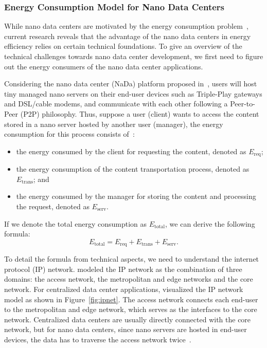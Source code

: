 \subsubsection{Energy Consumption Model for Nano Data Centers}

While nano data centers are motivated by the energy consumption problem~\cite{DBLP:conf/conext/ValanciusLMDR09},
current research reveals that the advantage of the nano data centers in energy efficiency relies on certain technical foundations.
To give an overview of the technical challenges towards nano data center development,
we first need to figure out the energy consumers of the nano data center applications.

Considering the nano data center (NaDa) platform proposed in~\cite{DBLP:conf/conext/ValanciusLMDR09},
users will host tiny managed nano servers on their end-user devices such as Triple-Play gateways and DSL/cable modems,
and communicate with each other following a Peer-to-Peer (P2P) philosophy.
Thus, suppose a user (client) wants to access the content stored in a nano server hosted by another user (manager),
the energy consumption for this process consists of~\cite{DBLP:journals/sigmetrics/JalaliAVHAT14}:
\begin{itemize}
\item the energy consumed by the client for requesting the content, denoted as $E_\text{req}$;
\item the energy consumption of the content transportation process, denoted as $E_\text{trans}$; and
\item the energy consumed by the manager for storing the content and processing the request, denoted as $E_\text{serv}$.
\end{itemize}
If we denote the total energy consumption as $E_\text{total}$, we can derive the following formula:
\begin{equation}
E_\text{total}=E_\text{req}+E_\text{trans}+E_\text{serv} \label{abstract_model}.
\end{equation}

To detail the formula from technical aspects, we need to understand the internet protocol (IP) network.
\cite{iptv} modeled the IP network as the combination of three domains:
the access network, the metropolitan and edge networks and the core network.
For centralized data center applications,
\cite{iptv} visualized the IP network model as shown in Figure~\ref{fig:ipnet}.
The access network connects each end-user to the metropolitan and edge network,
which serves as the interfaces to the core network.
Centralized data centers are usually directly connected with the core network,
but for nano data centers, since nano servers are hosted in end-user devices,
the data has to traverse the access network twice~\cite{tradeoff}.
 
